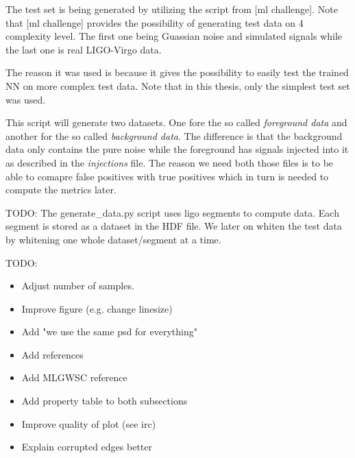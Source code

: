 The test set is being generated by utilizing the  script
from [ml challenge]. Note that [ml challenge] provides the possibility of
generating test data on 4 complexity level. The first one being Guassian noise
and simulated signals while the last one is real LIGO-Virgo data.

The reason it was used is because it gives the possibility to easily test the
trained NN on more complex test data. Note that in this thesis, only the simplest
test set was used.

This script will generate two datasets. One fore the so called
\textit{foreground data} and another for the so called \textit{background data}.
The difference is that the background data only contains the pure noise
while the foreground has signals injected into it as described in the
\textit{injections} file. The reason we need both those files is to be able to
comapre false positives with true positives which in turn is needed to compute
the metrics later.

TODO: The generate\_data.py script uses ligo segments to compute data. Each
segment is stored as a dataset in the HDF file. We later on whiten the test data
by whitening one whole dataset/segment at a time.

TODO:
\begin{itemize}
  \item Adjust number of samples.
  \item Improve figure (e.g. change linesize)
  \item Add "we use the same psd for everything"
  \item Add references
  \item Add MLGWSC reference
  \item Add property table to both subsections
  \item Improve quality of plot (see irc)
  \item Explain corrupted edges better
\end{itemize}
